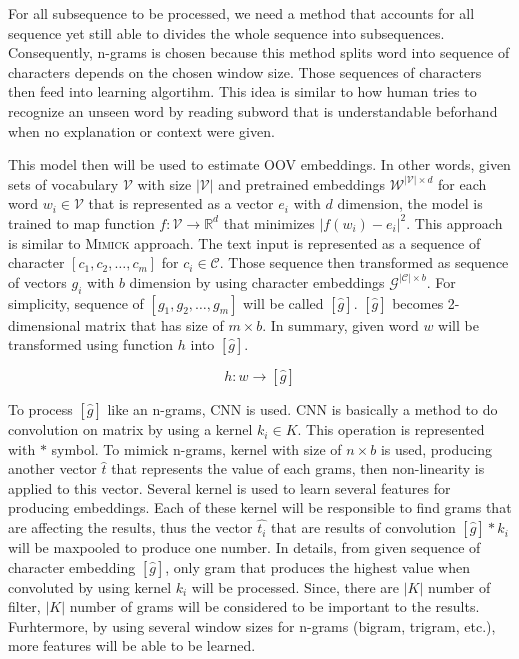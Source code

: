 For all subsequence to be processed, we need a method that accounts
for all sequence yet still able to divides the whole sequence into
subsequences. Consequently, n-grams is chosen because this method
splits word into sequence of characters depends on the chosen window
size. Those sequences of characters then feed into learning algortihm.
This idea is similar to how human tries to recognize an unseen word by
reading subword that is understandable beforhand when no explanation
or context were given. 

This model then will be used to estimate OOV embeddings. In other
words, given sets of vocabulary $\mathcal{V}$ with size $\vert\mathcal{V}\vert$ and
pretrained embeddings $\mathcal{W}^{\vert\mathcal{V}\vert \times d}$ for each word $w_{i}
\in \mathcal{V}$ that is represented as a vector $e_i$ with $d$
dimension, the model is trained to map function $f:\mathcal{V}
\rightarrow \mathbb{R}^d$ that minimizes $\vert f(w_i) - e_i
\vert^{2}$. This approach is similar to \textsc{Mimick}
\cite{mimicking2017Pinter} approach. The text input is represented as
a sequence of character $[c_1, c_2, \dots, c_m]$ for $c_i \in
\mathcal{C}$. Those sequence then transformed as sequence of vectors
$g_i$ with $b$ dimension by using character embeddings
$\mathcal{G}^{\vert \mathcal{C} \vert \times b}$. For simplicity,
sequence of $[g_1, g_2, \dots, g_m]$ will be called $[\hat{g}]$.
$[\hat{g}]$ becomes 2-dimensional matrix that has size of $m \times
b$. In summary, given word $w$ will be transformed using function $h$
into $[\hat{g}]$.

\begin{equation}
    \label{eq:word2charemb}
    h: w \rightarrow [\hat{g}]
\end{equation}

To process $[\hat{g}]$ like an n-grams, CNN is used. CNN is basically
a method to do convolution on matrix by using a kernel $k_i \in K$. This
operation is represented with $*$ symbol. To mimick n-grams, kernel
with size of $n \times b$ is used, producing another vector $\hat{t}$
that represents the value of each grams, then non-linearity is applied
to this vector. Several kernel is used to learn several features for
producing embeddings. Each of these kernel will be responsible to find
grams that are affecting the results, thus the vector $\hat{t_i}$ that
are results of convolution $[\hat{g}] * k_i$ will be maxpooled to
produce one number. In details, from given sequence of character
embedding $[\hat{g}]$, only gram that produces the highest value when
convoluted by using kernel $k_i$ will be processed. Since, there are
$\vert K \vert$ number of filter, $\vert K \vert$ number of grams will
be considered to be important to the results. Furhtermore, by using
several window sizes for n-grams (bigram, trigram, etc.), more
features will be able to be learned. 